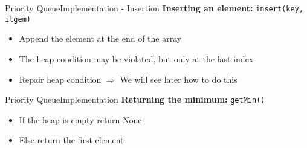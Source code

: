 \begin{frame}{Priority Queue}{Implementation - Insertion}
  \textbf{Inserting an element:}
  {\color{Mittel-Blau}\texttt{insert(key, itgem)}}
  \begin{itemize}
    \item
      Append the element at the end of the array
    \item
      The {\color{Mittel-Blau}heap condition} may be violated, but only at the
      last index
    \item
      Repair {\color{Mittel-Blau}heap condition}
      $\Rightarrow$ We will see later how to do this
  \end{itemize}
  \begin{figure}[!h]
    \begin{adjustbox}{height=0.275\linewidth}
    \end{adjustbox}
    \hspace{-1.5em}
    \begin{adjustbox}{height=0.275\linewidth}
    \end{adjustbox}
    \label{fig:priority_queue:impl_insert}%
  \end{figure}%
\end{frame}


\begin{frame}{Priority Queue}{Implementation}
  \textbf{Returning the minimum:}
  {\color{Mittel-Blau}\texttt{getMin()}}
  \begin{itemize}
    \item
      If the heap is empty return {\color{Mittel-Blau}None}
    \item
      Else return the first element
  \end{itemize}
  \begin{figure}[!h]
    \begin{adjustbox}{height=0.275\linewidth}
    \end{adjustbox}
    \hspace{1.75em}
    \hfill
    \label{fig:priority_queue:impl_peek}%
  \end{figure}%
\end{frame}

